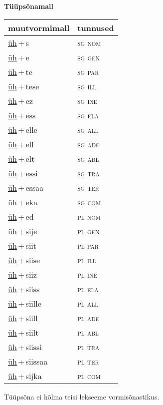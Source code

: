 
\vspace{1.8em}
\begin{minipage}{\textwidth}
\textbf{Tüüpsõnamall \,}\\

\begin{sideways}
\begin{tabular}{l l}
muutvormimall & tunnused \\
\hline
\underline{üh}\,+\,s & \textsc{ sg nom } \\
\underline{üh}\,+\,e & \textsc{ sg gen } \\
\underline{üh}\,+\,te & \textsc{ sg par } \\
\underline{üh}\,+\,tese & \textsc{ sg ill } \\
\underline{üh}\,+\,ez & \textsc{ sg ine } \\
\underline{üh}\,+\,ess & \textsc{ sg ela } \\
\underline{üh}\,+\,elle & \textsc{ sg all } \\
\underline{üh}\,+\,ell & \textsc{ sg ade } \\
\underline{üh}\,+\,elt & \textsc{ sg abl } \\
\underline{üh}\,+\,essi & \textsc{ sg tra } \\
\underline{üh}\,+\,essaa & \textsc{ sg ter } \\
\underline{üh}\,+\,eka & \textsc{ sg com } \\
\underline{üh}\,+\,ed & \textsc{ pl nom } \\
\underline{üh}\,+\,sije & \textsc{ pl gen } \\
\underline{üh}\,+\,siit & \textsc{ pl par } \\
\underline{üh}\,+\,siise & \textsc{ pl ill } \\
\underline{üh}\,+\,siiz & \textsc{ pl ine } \\
\underline{üh}\,+\,siiss & \textsc{ pl ela } \\
\underline{üh}\,+\,siille & \textsc{ pl all } \\
\underline{üh}\,+\,siill & \textsc{ pl ade } \\
\underline{üh}\,+\,siilt & \textsc{ pl abl } \\
\underline{üh}\,+\,siissi & \textsc{ pl tra } \\
\underline{üh}\,+\,siissaa & \textsc{ pl ter } \\
\underline{üh}\,+\,sijka & \textsc{ pl com } \\
\end{tabular}
\end{sideways}
\label{tab:tüüpsõnamall-ühs}

\end{minipage}

 
\vspace{1em}
\noindent Tüüpsõna ei hõlma teisi lekseeme vormi\-sõnastikus.
